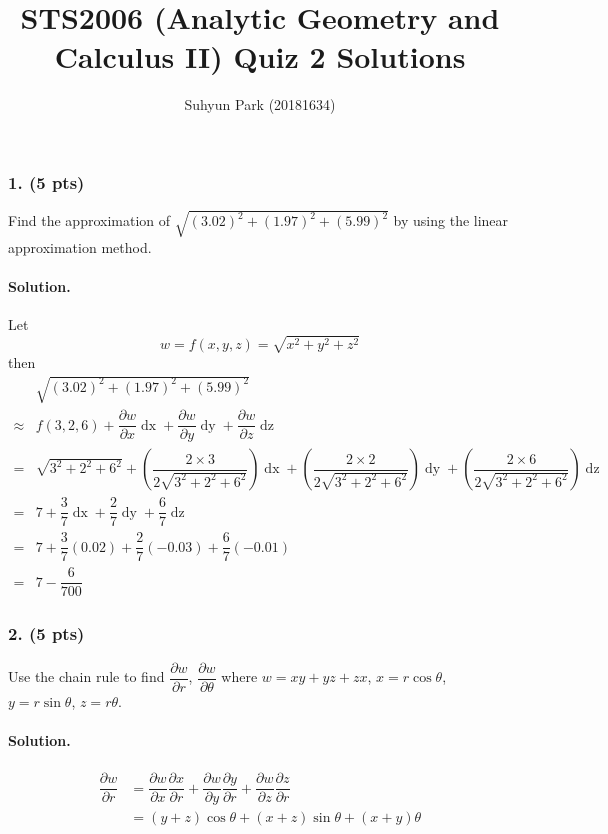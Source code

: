\documentclass[runningheads]{llncs}
\begin{document}
\title{STS2006 (Analytic Geometry and Calculus II) \newline Quiz 2 Solutions}
\author{Suhyun Park (20181634)}
\maketitle

\subsubsection{1. (5 pts)} Find the approximation of $\sqrt{\left(3.02\right)^2+\left(1.97\right)^2+\left(5.99\right)^2}$ by using the linear approximation method.

\paragraph{Solution.} Let \[w = f\left(x, y, z\right) = \sqrt{x^2+y^2+z^2}\]
then
\begin{align*}
	&\sqrt{\left(3.02\right)^2+\left(1.97\right)^2+\left(5.99\right)^2}\\
	\approx & f\left(3, 2, 6\right)
		+\dfrac{\partial w}{\partial x}\mathop{dx}
		+\dfrac{\partial w}{\partial y}\mathop{dy}
		+\dfrac{\partial w}{\partial z}\mathop{dz}\\
	=&\sqrt{3^2+2^2+6^2}
		+\left(\dfrac{2\times3}{2\sqrt{3^2+2^2+6^2}}\right)\mathop{dx}
		+\left(\dfrac{2\times2}{2\sqrt{3^2+2^2+6^2}}\right)\mathop{dy}
		+\left(\dfrac{2\times6}{2\sqrt{3^2+2^2+6^2}}\right)\mathop{dz}\\
	=&7+\dfrac{3}{7}\mathop{dx}+\dfrac{2}{7}\mathop{dy}+\dfrac{6}{7}\mathop{dz}\\
	=&7+\dfrac{3}{7}\left(0.02\right)+\dfrac{2}{7}\left(-0.03\right)+\dfrac{6}{7}\left(-0.01\right)\\
	=&7-\dfrac{6}{700}
\end{align*}
\par

\subsubsection{2. (5 pts)} Use the chain rule to find $\dfrac{\partial w}{\partial r}$, $\dfrac{\partial w}{\partial \theta}$ where $w=xy+yz+zx$, $x=r\cos\theta$, $y=r\sin\theta$, $z=r\theta$.

\paragraph{Solution.}
\begin{align*}
	\dfrac{\partial w}{\partial r}
	&= \dfrac{\partial w}{\partial x}\dfrac{\partial x}{\partial r}
		 + \dfrac{\partial w}{\partial y}\dfrac{\partial y}{\partial r}
		 + \dfrac{\partial w}{\partial z}\dfrac{\partial z}{\partial r}\\
	&= \left(y+z\right)\cos\theta+\left(x+z\right)\sin\theta+\left(x+y\right)\theta
\end{align*}
\end{document}
